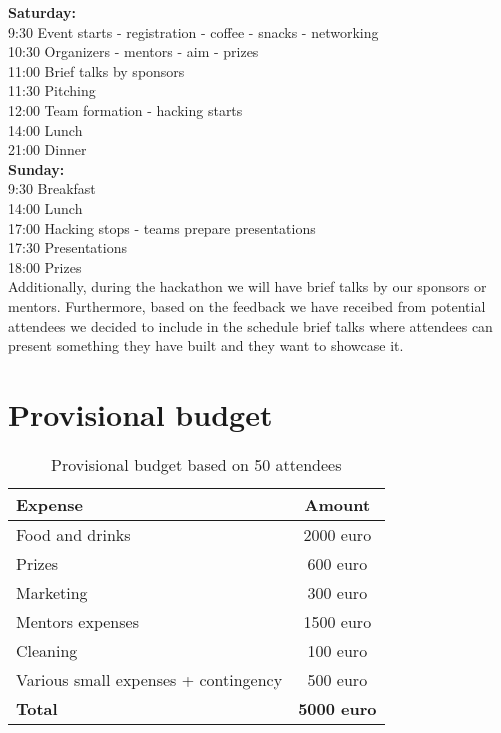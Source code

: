 \documentclass[a4paper,11pt]{report}
\begin{document}
\noindent\textbf{Saturday:}\\
9:30 Event starts - registration - coffee - snacks - networking\\
10:30 Organizers - mentors - aim - prizes\\
11:00 Brief talks by sponsors\\
11:30 Pitching\\
12:00 Team formation - hacking starts\\
14:00 Lunch\\
21:00 Dinner\\

\noindent\textbf{Sunday:}\\
9:30 Breakfast \\
14:00 Lunch\\
17:00 Hacking stops - teams prepare presentations\\
17:30 Presentations \\
18:00 Prizes\\

Additionally, during the hackathon we will have brief talks by our sponsors or mentors. Furthermore, based on the feedback we have receibed from potential attendees we decided to include in the schedule brief talks where attendees can present something they have built and they want to showcase it.

\section{Provisional budget}
\begin{table}[h]
\caption{Provisional budget based on 50 attendees} %
\centering %
\begin{tabular}{l c} %
\hline\hline                        %
Expense & Amount \\ [0.5ex]   
\hline            
Food and drinks  & 2000 euro\\ %
Prizes           & 600 euro\\
Marketing        & 300 euro\\%
Mentors expenses & 1500 euro\\
Cleaning         & 100 euro\\
Various small expenses + contingency & 500 euro\\
\hline 
\textbf{Total} & \textbf{5000 euro}\\
\hline
\end{tabular}
\end{table}
\end{document}
